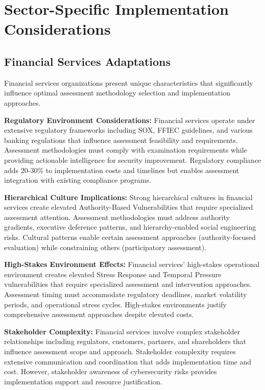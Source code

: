 \documentclass[10pt, twocolumn]{article}
\begin{document}
\section{Sector-Specific Implementation Considerations}

\subsection{Financial Services Adaptations}

Financial services organizations present unique characteristics that significantly influence optimal assessment methodology selection and implementation approaches.

\textbf{Regulatory Environment Considerations:} Financial services operate under extensive regulatory frameworks including SOX, FFIEC guidelines, and various banking regulations that influence assessment feasibility and requirements. Assessment methodologies must comply with examination requirements while providing actionable intelligence for security improvement. Regulatory compliance adds 20-30\% to implementation costs and timelines but enables assessment integration with existing compliance programs.

\textbf{Hierarchical Culture Implications:} Strong hierarchical cultures in financial services create elevated Authority-Based Vulnerabilities that require specialized assessment attention. Assessment methodologies must address authority gradients, executive deference patterns, and hierarchy-enabled social engineering risks. Cultural patterns enable certain assessment approaches (authority-focused evaluation) while constraining others (participatory assessment).

\textbf{High-Stakes Environment Effects:} Financial services' high-stakes operational environment creates elevated Stress Response and Temporal Pressure vulnerabilities that require specialized assessment and intervention approaches. Assessment timing must accommodate regulatory deadlines, market volatility periods, and operational stress cycles. High-stakes environments justify comprehensive assessment approaches despite elevated costs.

\textbf{Stakeholder Complexity:} Financial services involve complex stakeholder relationships including regulators, customers, partners, and shareholders that influence assessment scope and approach. Stakeholder complexity requires extensive communication and coordination that adds implementation time and cost. However, stakeholder awareness of cybersecurity risks provides implementation support and resource justification.
\end{document}
